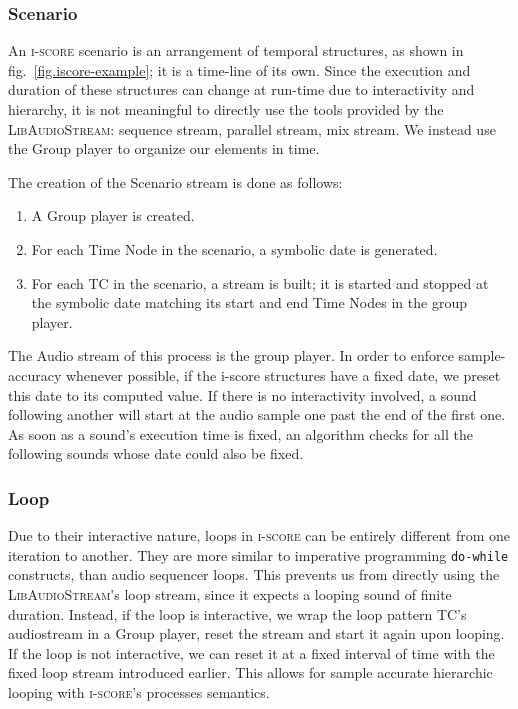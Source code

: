 \documentclass{article}
\newcommand*{\LibAudioStream}{\textsc{LibAudioStream}\xspace}
\newcommand*{\iscore}{\textsc{i-score}\xspace}
\newcommand*{\timeconstraint}{\ac{TC}\xspace}
\begin{document}
\subsubsection{Scenario}
An \iscore scenario is an arrangement of temporal structures, as shown in fig.~\ref{fig.iscore-example}; it is a time-line of its own.
Since the execution and duration of these structures can change at run-time due to interactivity and hierarchy, it is not meaningful to directly use the tools provided by the \LibAudioStream: sequence stream, parallel stream, mix stream.
We instead use the Group player to organize our elements in time.

The creation of the Scenario stream is done as follows: 
\begin{enumerate}
	\item A Group player is created.
	\item For each Time Node in the scenario, a symbolic date is generated.
	\item For each \timeconstraint in the scenario, a stream is built; it is started and stopped at the symbolic date matching its start and end Time Nodes in the group player.
\end{enumerate}

The Audio stream of this process is the group player.
In order to enforce sample-accuracy whenever possible, if the i-score structures have a fixed date, we preset this date to its computed value.
If there is no interactivity involved, a sound following another will start at the audio sample one past the end of the first one. 
As soon as a sound's execution time is fixed, an algorithm checks for all the following sounds whose date could also be fixed.

\subsubsection{Loop}
Due to their interactive nature, loops in \iscore can be entirely different from 
one iteration to another. 
They are more similar to imperative programming \texttt{do-while} constructs, than audio sequencer loops.
This prevents us from directly using the \LibAudioStream's loop stream, since it expects a looping sound of finite duration.
Instead, if the loop is interactive, we wrap the loop pattern \timeconstraint's audiostream in a Group player, reset the stream and start it again upon looping.
If the loop is not interactive, we can reset it at a fixed interval of time with the fixed loop stream introduced earlier.
This allows for sample accurate hierarchic looping with \iscore's processes semantics.
\end{document}
